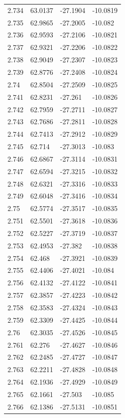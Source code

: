\begin{tabular}{llll}
2.734 & 63.0137 & -27.1904 & -10.0819 \\
2.735 & 62.9865 & -27.2005 & -10.082 \\
2.736 & 62.9593 & -27.2106 & -10.0821 \\
2.737 & 62.9321 & -27.2206 & -10.0822 \\
2.738 & 62.9049 & -27.2307 & -10.0823 \\
2.739 & 62.8776 & -27.2408 & -10.0824 \\
2.74 & 62.8504 & -27.2509 & -10.0825 \\
2.741 & 62.8231 & -27.261 & -10.0826 \\
2.742 & 62.7959 & -27.2711 & -10.0827 \\
2.743 & 62.7686 & -27.2811 & -10.0828 \\
2.744 & 62.7413 & -27.2912 & -10.0829 \\
2.745 & 62.714 & -27.3013 & -10.083 \\
2.746 & 62.6867 & -27.3114 & -10.0831 \\
2.747 & 62.6594 & -27.3215 & -10.0832 \\
2.748 & 62.6321 & -27.3316 & -10.0833 \\
2.749 & 62.6048 & -27.3416 & -10.0834 \\
2.75 & 62.5774 & -27.3517 & -10.0835 \\
2.751 & 62.5501 & -27.3618 & -10.0836 \\
2.752 & 62.5227 & -27.3719 & -10.0837 \\
2.753 & 62.4953 & -27.382 & -10.0838 \\
2.754 & 62.468 & -27.3921 & -10.0839 \\
2.755 & 62.4406 & -27.4021 & -10.084 \\
2.756 & 62.4132 & -27.4122 & -10.0841 \\
2.757 & 62.3857 & -27.4223 & -10.0842 \\
2.758 & 62.3583 & -27.4324 & -10.0843 \\
2.759 & 62.3309 & -27.4425 & -10.0844 \\
2.76 & 62.3035 & -27.4526 & -10.0845 \\
2.761 & 62.276 & -27.4627 & -10.0846 \\
2.762 & 62.2485 & -27.4727 & -10.0847 \\
2.763 & 62.2211 & -27.4828 & -10.0848 \\
2.764 & 62.1936 & -27.4929 & -10.0849 \\
2.765 & 62.1661 & -27.503 & -10.085 \\
2.766 & 62.1386 & -27.5131 & -10.0851 \\

\end{tabular}
